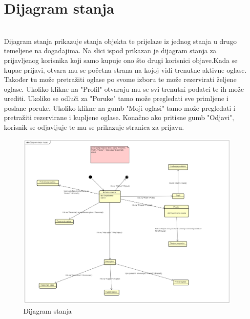 			
			\eject
			
			\section{Dijagram stanja}
			
				\textbf{\textit{}}\\
			
Dijagram stanja prikazuje stanja objekta te prijelaze iz jednog stanja u drugo temeljene na dogadajima. Na slici ispod prikazan je dijagram stanja za prijavljenog korisnika koji samo kupuje ono što drugi korisnici objave.Kada se kupac prijavi, otvara mu se početna strana na kojoj vidi trenutne aktivne oglase. Također tu može pretražiti oglase po svome izboru te može rezervirati željene oglase. Ukoliko klikne na "Profil" otvaraju mu se svi trenutni podatci te ih može urediti. Ukoliko se odluči za "Poruke" tamo može pregledati sve primljene i poslane poruke. Ukoliko klikne na gumb "Moji oglasi" tamo može pregledati i pretražiti rezervirane i kupljene oglase. Konačno ako pritisne gumb "Odjavi", korisnik se odjavljuje te mu se prikazuje stranica za prijavu.

			\begin{figure}[H]
				\includegraphics[scale=0.3]{slike/Dijagram_stanja_kupac.PNG} %
				\centering
				\caption{Dijagram stanja}
				\label{fig:dijagramStanja}
			\end{figure}
			
			
			\eject 
			
